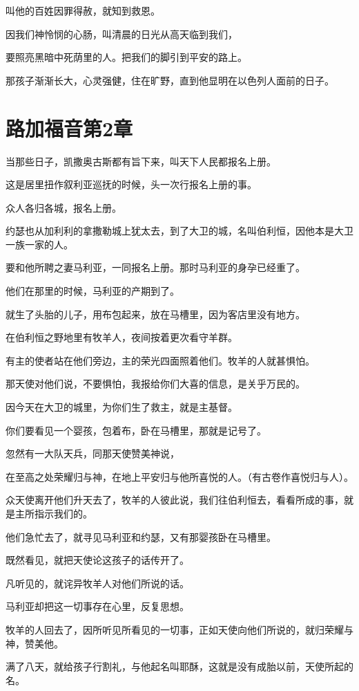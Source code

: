 \documentclass[12pt,oneside]{book}
\begin{document}
叫他的百姓因罪得赦，就知到救恩。

因我们神怜悯的心肠，叫清晨的日光从高天临到我们，

要照亮黑暗中死荫里的人。把我们的脚引到平安的路上。

那孩子渐渐长大，心灵强健，住在旷野，直到他显明在以色列人面前的日子。

\chapter{路加福音第2章}
当那些日子，凯撒奥古斯都有旨下来，叫天下人民都报名上册。

这是居里扭作叙利亚巡抚的时候，头一次行报名上册的事。

众人各归各城，报名上册。

约瑟也从加利利的拿撒勒城上犹太去，到了大卫的城，名叫伯利恒，因他本是大卫一族一家的人。

要和他所聘之妻马利亚，一同报名上册。那时马利亚的身孕已经重了。

他们在那里的时候，马利亚的产期到了。

就生了头胎的儿子，用布包起来，放在马槽里，因为客店里没有地方。

在伯利恒之野地里有牧羊人，夜间按着更次看守羊群。

有主的使者站在他们旁边，主的荣光四面照着他们。牧羊的人就甚惧怕。

那天使对他们说，不要惧怕，我报给你们大喜的信息，是关乎万民的。

因今天在大卫的城里，为你们生了救主，就是主基督。

你们要看见一个婴孩，包着布，卧在马槽里，那就是记号了。

忽然有一大队天兵，同那天使赞美神说，

在至高之处荣耀归与神，在地上平安归与他所喜悦的人。（有古卷作喜悦归与人）。

众天使离开他们升天去了，牧羊的人彼此说，我们往伯利恒去，看看所成的事，就是主所指示我们的。

他们急忙去了，就寻见马利亚和约瑟，又有那婴孩卧在马槽里。

既然看见，就把天使论这孩子的话传开了。

凡听见的，就诧异牧羊人对他们所说的话。

马利亚却把这一切事存在心里，反复思想。

牧羊的人回去了，因所听见所看见的一切事，正如天使向他们所说的，就归荣耀与神，赞美他。

满了八天，就给孩子行割礼，与他起名叫耶酥，这就是没有成胎以前，天使所起的名。
\end{document}
